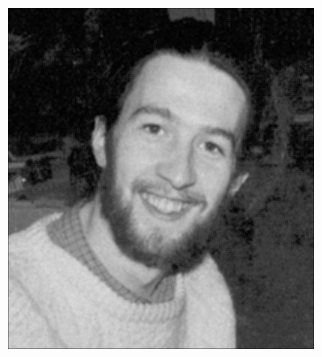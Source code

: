 \documentclass[12pt,a4paper]{report}
\begin{document}
\begin{figure}[!htb]
\begin{minipage}{\linewidth}
\begin{subfigure}{0.49\textwidth}
      \includegraphics[width=\linewidth]{output/noise2_q1_K3P1.png}
    \end{subfigure}


\end{minipage}
\end{figure}
\end{document}
